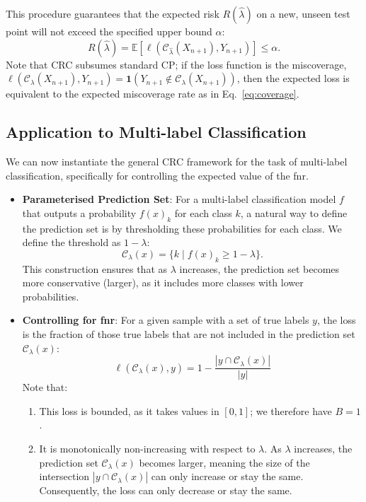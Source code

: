 This procedure guarantees that the expected risk \(R \left( \hat{\lambda} \right)\) on a new,
unseen test point will not exceed the specified upper bound \(\alpha\):
\begin{equation}
    \label{eq:crc-guarantee}
    R \left( \hat{\lambda} \right) =
    \mathbb{E} \left[ \ell \left( \mathcal{C}_{\hat{\lambda}}(X_{n+1}), Y_{n+1} \right) \right] \leq \alpha.
\end{equation}
Note that CRC subsumes standard CP;
if the loss function is the miscoverage,
\(\ell(\mathcal{C}_\lambda(X_{n+1}), Y_{n+1}) = \mathbf{1}(Y_{n+1} \notin \mathcal{C}_\lambda(X_{n+1}))\),
then the expected loss is equivalent to the expected miscoverage rate as in Eq.~\ref{eq:coverage}.

\subsection{Application to Multi-label Classification}

We can now instantiate the general CRC framework for the task of multi-label classification,
specifically for controlling the expected value of the \gls{fnr}.

\begin{itemize}
    \item \textbf{Parameterised Prediction Set}:
    For a multi-label classification model \(f\)
    that outputs a probability \(f(x)_k\) for each class \(k\),
    a natural way to define the prediction set is by thresholding these probabilities for each class.
    We define the threshold as \(1 - \lambda\):
    \[
        \mathcal{C}_{\lambda}(x) = \{k \mid f(x)_k \ge 1 - \lambda \}.
    \]
    This construction ensures that as \(\lambda\) increases,
    the prediction set becomes more conservative (larger),
    as it includes more classes with lower probabilities.

    \item \textbf{Controlling for \gls{fnr}}:
    For a given sample with a set of true labels \(y\),
    the loss is the fraction of those true labels that are not included in the prediction set
    \(\mathcal{C}_\lambda(x)\):
    \[
        \ell(\mathcal{C}_\lambda(x), y) = 1 - \frac{|y \cap \mathcal{C}_\lambda(x)|} {|y|}
    \]
    Note that:
    \begin{enumerate}
        \item This loss is bounded, as it takes values in \([0, 1]\); we therefore have \(B = 1\).
        \item It is monotonically non-increasing with respect to \(\lambda\).
        As \(\lambda\) increases, the prediction set \(\mathcal{C}_\lambda(x)\) becomes larger,
        meaning the size of the intersection \(|y \cap \mathcal{C}_\lambda(x)|\)
        can only increase or stay the same.
        Consequently, the loss can only decrease or stay the same.
    \end{enumerate}
\end{itemize}

